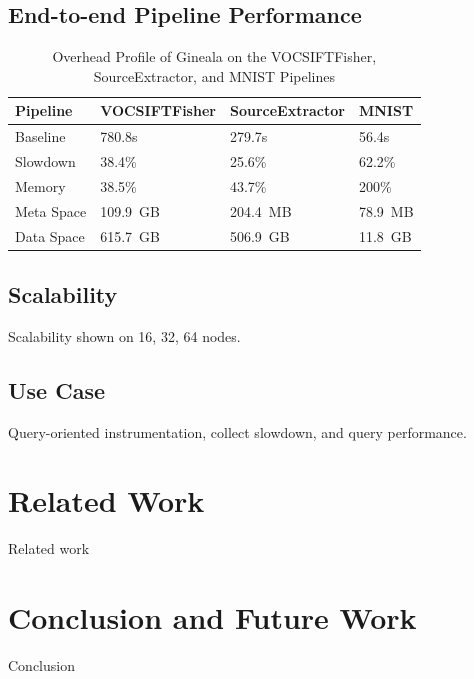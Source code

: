 \documentclass{sig-alternate}
\begin{document}
\subsection{End-to-end Pipeline Performance}

\begin{table}[ht]
\begin{center}
    \caption{Overhead Profile of Gineala on the VOCSIFTFisher, SourceExtractor, and MNIST Pipelines}
    \begin{scriptsize}
    \begin{tabular}{ | p{1.5cm} | p{2cm} | p{2cm} | p{1.5cm} | }
    \hline
    Pipeline & VOCSIFTFisher & SourceExtractor & MNIST  \\ \hline \hline
    Baseline & 780.8s & 279.7s & 56.4s \\ \hline
    Slowdown & 38.4\% & 25.6\% & 62.2\%   \\ \hline
    Memory & 38.5\% & 43.7\% & 200\%\\ \hline
    Meta Space & 109.9~GB & 204.4~MB & 78.9~MB \\ \hline
    Data Space & 615.7~GB & 506.9~GB & 11.8~GB\\ \hline
    \end{tabular}
    \end{scriptsize}
    \label{tb:apps-overhead}
\end{center}   
\end{table}

\subsection{Scalability}
Scalability shown on 16, 32, 64 nodes.

\subsection{Use Case}
Query-oriented instrumentation, collect slowdown, and query performance.

\section{Related Work}
\label{sec:Related}
Related work

\section{Conclusion and Future Work}
\label{sec:Conclusion}
Conclusion

\end{document}
